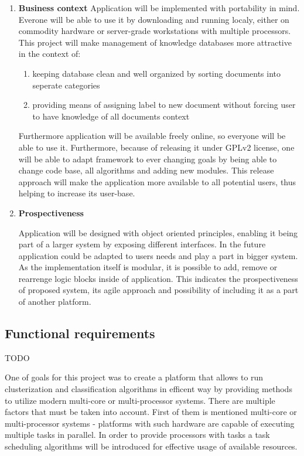 	\begin{enumerate}
	
	\item \textbf{Business context}
	Application will be implemented with portability in mind. Everone will be able to use it by downloading and running localy, either on commodity hardware or server-grade workstations with multiple processors. This project will make management of knowledge databases more attractive in the context of:
	
	\begin{enumerate}
		\item keeping database clean and well organized by sorting documents into seperate categories
		\item providing means of assigning label to new document without forcing user to have knowledge of all documents context
	\end{enumerate}
	
	Furthermore application will be available freely online, so everyone will be able to use it. Furthermore, because of releasing it under GPLv2 license, one will be able to adapt framework to ever changing goals by being able to change code base, all algorithms and adding new modules. This release approach will make the application more available to all potential users, thus helping to increase its user-base.  
	
	\item \textbf{Prospectiveness}
	
	Application will be designed with object oriented principles, enabling it being part of a larger system by exposing different interfaces. In the future application could be adapted to users needs and play a part in bigger system. As the implementation itself is modular, it is possible to add, remove or rearrenge logic blocks inside of application. This indicates the prospectiveness of proposed system, its agile approach and possibility of including it as a part of another platform.
	
	\end{enumerate}

\subsection{Functional requirements} \label{design-functional}
TODO

One of goals for this project was to create a platform that allows to run clusterization and classification algorithms in efficent way by providing methods to utilize modern multi-core or multi-processor systems. There are multiple factors that must be taken into account. First of them is mentioned multi-core or multi-processor systems - platforms with such hardware are capable of executing multiple tasks in parallel. In order to provide processors with tasks a task scheduling algorithms will be introduced for effective usage of available resources.  


